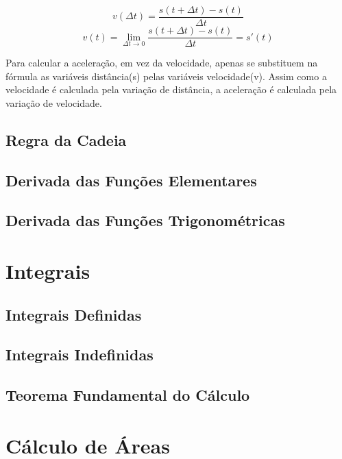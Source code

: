 \documentclass[ ]{article}
\begin{document}
		$$v(\Delta t) = \frac{s(t+\Delta t)-s(t)}{\Delta t}$$
		$$v(t) =\lim_{\Delta t\to 0}\frac{s(t+\Delta t)-s(t)}{\Delta t}= s'(t)$$
		
		Para calcular a aceleração, em vez da velocidade, apenas se substituem na fórmula as variáveis distância(s) pelas variáveis velocidade(v). Assim como a velocidade é calculada pela variação de distância, a aceleração é calculada pela variação de velocidade.
		
	\subsection{Regra da Cadeia}
	\subsection{Derivada das Funções Elementares}
	\subsection{Derivada das Funções Trigonométricas}
\section{Integrais}
	\subsection{Integrais Definidas}
	\subsection{Integrais Indefinidas}
	\subsection{Teorema Fundamental do Cálculo}
\section{Cálculo de Áreas}
	
\end{document}
